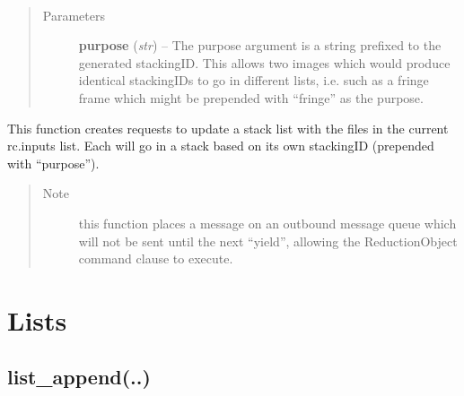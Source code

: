 \documentclass[letterpaper,10pt,english]{sphinxmanual}
\begin{document}
\begin{fulllineitems}
\label{chapter_ReductionContextClass:astrodata.RecipeManager.ReductionContext.rq_stack_update}~\begin{quote}\begin{description}
\item[{Parameters}] \leavevmode
\textbf{purpose} (\emph{str}) -- The purpose argument is a string prefixed to the
generated stackingID.  This allows two images which would
produce identical stackingIDs to go in different lists,
i.e. such as a fringe frame which might be prepended with
``fringe'' as the purpose.

\end{description}\end{quote}

This function creates requests to update a stack list with the files
in the current rc.inputs list.  Each will go in a stack based on its
own stackingID (prepended with ``purpose'').
\begin{quote}\begin{description}
\item[{Note }] \leavevmode
this function places a message on an outbound message queue
which will not be sent until the next ``yield'', allowing the
ReductionObject command clause to execute.

\end{description}\end{quote}

\end{fulllineitems}



\section{Lists}
\label{chapter_ReductionContextClass:lists}

\subsection{list\_append(..)}
\label{chapter_ReductionContextClass:list-append}
\end{document}
